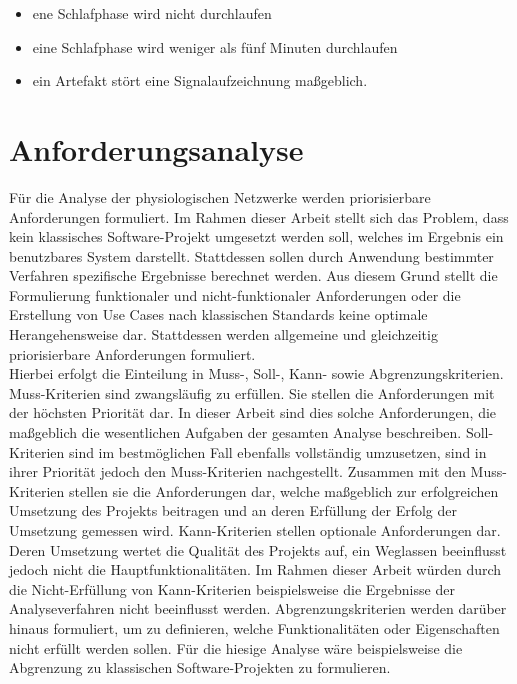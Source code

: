 \begin{itemize}
\item ene Schlafphase wird nicht durchlaufen
\item eine Schlafphase wird weniger als fünf Minuten durchlaufen
\item ein Artefakt stört eine Signalaufzeichnung maßgeblich.\\
\end{itemize}




\section{Anforderungsanalyse}

Für die Analyse der physiologischen Netzwerke werden priorisierbare Anforderungen formuliert. Im Rahmen dieser Arbeit stellt sich das Problem, dass kein klassisches Software-Projekt umgesetzt werden soll, welches im Ergebnis ein benutzbares System darstellt. Stattdessen sollen durch Anwendung bestimmter Verfahren spezifische Ergebnisse berechnet werden. Aus diesem Grund stellt die Formulierung funktionaler und nicht-funktionaler Anforderungen oder die Erstellung von Use Cases nach klassischen Standards keine optimale Herangehensweise dar. Stattdessen werden allgemeine und gleichzeitig priorisierbare Anforderungen formuliert.\\

Hierbei erfolgt die Einteilung in Muss-, Soll-, Kann- sowie Abgrenzungskriterien. Muss-Kriterien sind zwangsläufig zu erfüllen. Sie stellen die Anforderungen mit der höchsten Priorität dar. In dieser Arbeit sind dies solche Anforderungen, die maßgeblich die wesentlichen Aufgaben der gesamten Analyse beschreiben. Soll-Kriterien sind im bestmöglichen Fall ebenfalls vollständig umzusetzen, sind in ihrer Priorität jedoch den Muss-Kriterien nachgestellt. Zusammen mit den Muss-Kriterien stellen sie die Anforderungen dar, welche maßgeblich zur erfolgreichen Umsetzung des Projekts beitragen und an deren Erfüllung der Erfolg der Umsetzung gemessen wird. Kann-Kriterien stellen optionale Anforderungen dar. Deren Umsetzung wertet die Qualität des Projekts auf, ein Weglassen beeinflusst jedoch nicht die Hauptfunktionalitäten. Im Rahmen dieser Arbeit würden durch die Nicht-Erfüllung von Kann-Kriterien beispielsweise die Ergebnisse der Analyseverfahren nicht beeinflusst werden. Abgrenzungskriterien werden darüber hinaus formuliert, um zu definieren, welche Funktionalitäten oder Eigenschaften nicht erfüllt werden sollen. Für die hiesige Analyse wäre beispielsweise die Abgrenzung zu klassischen Software-Projekten zu formulieren.\\

